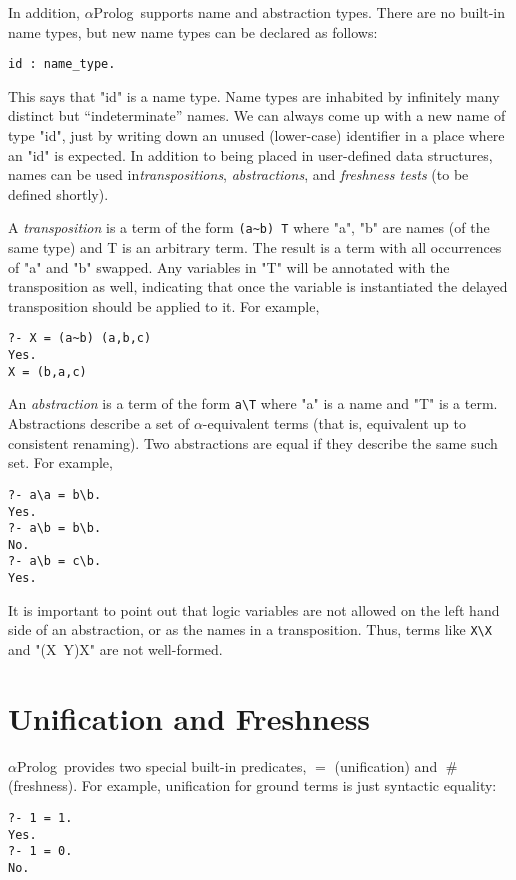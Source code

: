 \documentclass[draft,12pt]{report}
\newcommand{\aprolog}{$\alpha${Prolog}\xspace}
\newcommand{\fresh}{\mathrel\#}
\begin{document}
In addition, \aprolog\ supports name and abstraction types.  There are
no built-in name types, but new name types can be declared as follows:
\begin{verbatim}
id : name_type.
\end{verbatim}
This says that "id" is a name type.  Name types are inhabited by
infinitely many distinct but ``indeterminate'' names.  We can always
come up with a new name of type "id", just by writing down an unused
(lower-case) identifier in a place where an "id" is expected.  In
addition to being placed in user-defined data structures, names can be
used in\emph{transpositions}, \emph{abstractions}, and \emph{freshness tests} (to be defined shortly).

A \emph{transposition} is a term of the form \verb|(a~b) T| where "a",
"b" are names (of the same type) and T is an arbitrary term.  The
result is a term with all occurrences of "a" and "b" swapped.  Any
variables in "T" will be annotated with the transposition as well,
indicating that once the variable is instantiated the delayed
transposition should be applied to it.  For example,
\begin{verbatim}
?- X = (a~b) (a,b,c) 
Yes.
X = (b,a,c)
\end{verbatim}

An \emph{abstraction} is a term of the form \verb|a\T| where "a" is a
name and "T" is a term.  Abstractions describe a set of
$\alpha$-equivalent terms (that is, equivalent up to consistent
renaming).  Two abstractions are equal if they describe the same such
set.  For example,
\begin{verbatim}
?- a\a = b\b.
Yes.
?- a\b = b\b.
No.
?- a\b = c\b.
Yes.
\end{verbatim}

It is important to point out that logic variables are not allowed on
the left hand side of an abstraction, or as the names in a
transposition.  Thus, terms like \verb|X\X| and "(X~Y)X" are not
well-formed.

\section{Unification and Freshness}

\aprolog\ provides two special built-in predicates, $=$ (unification)
and $\fresh$ (freshness).  For example, unification for ground terms
is just syntactic equality:
\begin{verbatim}
?- 1 = 1.
Yes.
?- 1 = 0.
No.
\end{verbatim}
\end{document}
